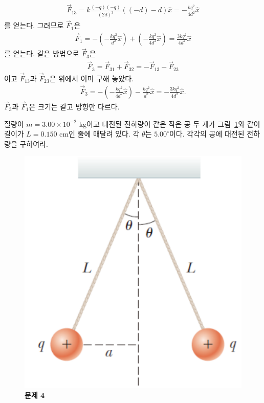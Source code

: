 \documentclass[floatfix,nofootinbib,superscriptaddress,fleqn,notitlepage]{revtex4-2}
\begin{document}
\begin{align}
  \vec{F}_{13} = k\frac{(-q)(-q)}{(2d)^3}((-d)-d)\hat{x}
  =-\frac{kq^2}{4d^2}\hat{x}
\end{align}
를 얻는다. 그러므로 $\vec{F}_{1}$은
\begin{align}
  \vec{F}_{1} = -\left(-\frac{kq^2}{d^2}\hat{x}\right)+\left(-\frac{kq^2}{4d^2}\hat{x}\right)
  =\frac{3kq^2}{4d^2}\hat{x}
\end{align}
를 얻는다. 같은 방법으로 $\vec{F}_{3}$은
\begin{align}
  \vec{F}_{3} = \vec{F}_{31}+\vec{F}_{32} = -\vec{F}_{13}-\vec{F}_{23}
\end{align}
이고 $\vec{F}_{13}$과 $\vec{F}_{23}$은 위에서 이미 구해 놓았다.
\begin{align}
  \vec{F}_{3} = -\left(-\frac{kq^2}{4d^2}\hat{x}\right)
  -\frac{kq^2}{d^2}\hat{x}=-\frac{3kq^2}{4d^2}\hat{x}.
\end{align}
$\vec{F}_{3}$과 $\vec{F}_{1}$은 크기는 같고 방향만 다르다.

\vspace{1.cm}
질량이 $m=3.00\times 10^{-2}$ kg이고 대전된 전하량이 같은 작은 공 두
개가 그림~\ref{fig:2}와 같이 길이가 $L=0.150$ cm인 줄에 매달려
있다. 각 $\theta$는 $5.00^\circ$이다. 
각각의 공에 대전된 전하량을 구하여라. 
\begin{figure}[htp]
  \centering
  \includegraphics[scale=0.6]{Qfig20220827-2.pdf}
  \caption{\textbf{문제 4}}
  \label{fig:2}
\end{figure}
\vspace{1.cm}
\end{document}
